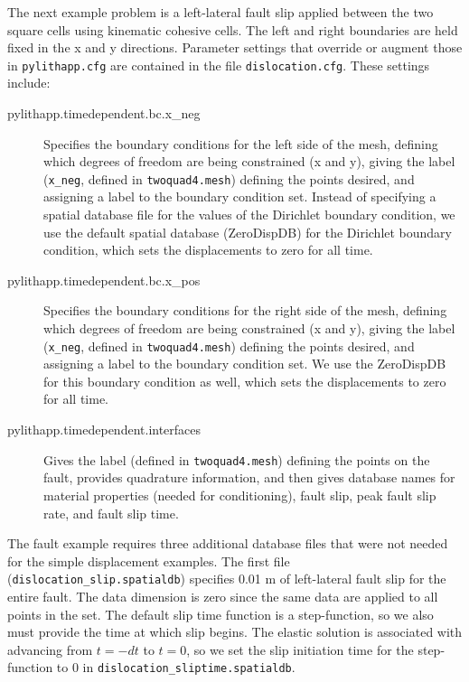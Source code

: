 The next example problem is a left-lateral fault slip applied between
the two square cells using kinematic cohesive cells. The left and
right boundaries are held fixed in the x and y directions. Parameter
settings that override or augment those in \texttt{pylithapp.cfg}
are contained in the file \texttt{dislocation.cfg}. These settings
include:
\begin{description}
\item [{pylithapp.timedependent.bc.x\_neg}] Specifies the boundary conditions
for the left side of the mesh, defining which degrees of freedom are
being constrained (x and y), giving the label (\texttt{x\_neg}, defined
in \texttt{twoquad4.mesh}) defining the points desired, and assigning
a label to the boundary condition set. Instead of specifying a spatial
database file for the values of the Dirichlet boundary condition,
we use the default spatial database (ZeroDispDB) for the Dirichlet
boundary condition, which sets the displacements to zero for all time.
\item [{pylithapp.timedependent.bc.x\_pos}] Specifies the boundary conditions
for the right side of the mesh, defining which degrees of freedom
are being constrained (x and y), giving the label (\texttt{x\_neg},
defined in \texttt{twoquad4.mesh}) defining the points desired, and
assigning a label to the boundary condition set. We use the ZeroDispDB
for this boundary condition as well, which sets the displacements
to zero for all time.
\item [{pylithapp.timedependent.interfaces}] Gives the label (defined in
\texttt{twoquad4.mesh}) defining the points on the fault, provides
quadrature information, and then gives database names for material
properties (needed for conditioning), fault slip, peak fault slip
rate, and fault slip time.
\end{description}
The fault example requires three additional database files that were
not needed for the simple displacement examples. The first file (\texttt{dislocation\_slip.spatialdb})
specifies 0.01 m of left-lateral fault slip for the entire fault.
The data dimension is zero since the same data are applied to all
points in the set. The default slip time function is a step-function,
so we also must provide the time at which slip begins. The elastic
solution is associated with advancing from $t=-dt$ to $t=0$, so
we set the slip initiation time for the step-function to 0 in \texttt{dislocation\_sliptime.spatialdb}.

